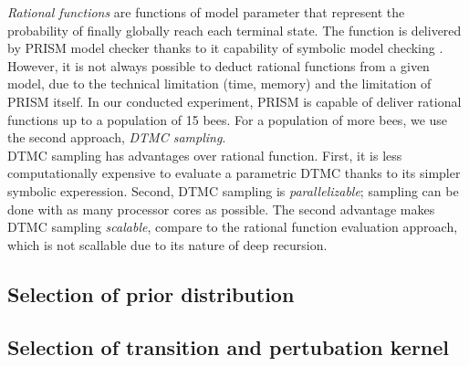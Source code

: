 \textit{Rational functions} are functions of model parameter that represent the
probability of finally globally reach each terminal state. The function is
delivered by PRISM model checker thanks to it capability of symbolic model
checking \cite{KNP11}.\\
However, it is not always possible to deduct rational functions from a given
model, due to the technical limitation (time, memory) and the limitation of
PRISM itself. In our conducted experiment, PRISM is capable of deliver rational
functions up to a population of 15 bees. For a population of more bees, we use
the second approach, \textit{DTMC sampling}.\\
DTMC sampling has advantages over rational function. First, it is less
computationally expensive to evaluate a parametric DTMC thanks to its simpler
symbolic experession. Second, DTMC sampling is \textit{parallelizable}; sampling
can be done with as many processor cores as possible. The second advantage makes
DTMC sampling \textit{scalable}, compare to the rational function evaluation
approach, which is not scallable due to its nature of deep recursion.

\subsection{Selection of prior distribution}

\subsection{Selection of transition and pertubation kernel}

